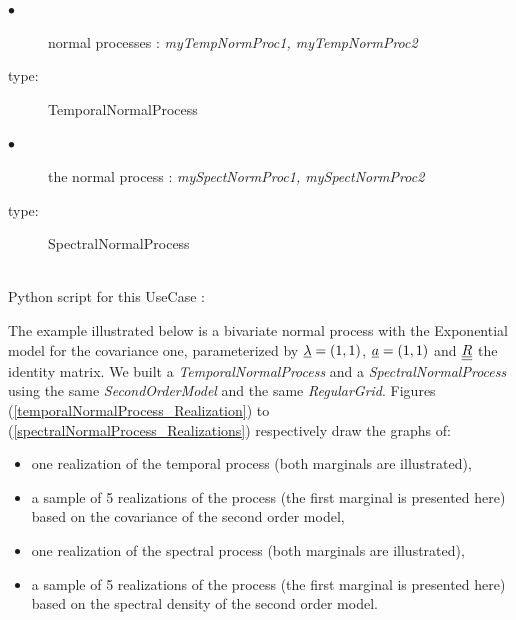 {

  \begin{description}
  \item[$\bullet$] normal processes : {\itshape myTempNormProc1, myTempNormProc2}
  \item[type:]  TemporalNormalProcess
  \end{description}

  \begin{description}
  \item[$\bullet$] the normal process : {\itshape mySpectNormProc1, mySpectNormProc2}
  \item[type:]  SpectralNormalProcess
  \end{description}
}

\textspace\\
Python script for this UseCase :\\




The example illustrated below is a bivariate normal process with the Exponential model for the covariance one, parameterized by  ${\underline{\lambda}}=(1,1)$, ${\underline{a}}=(1,1)$ and ${\underline{\underline{R}}}$ the identity matrix. We built a \textit{TemporalNormalProcess} and a \textit{SpectralNormalProcess} using the same \textit{SecondOrderModel} and the same \textit{RegularGrid}. Figures (\ref{temporalNormalProcess_Realization}) to (\ref{spectralNormalProcess_Realizations}) respectively draw the graphs of:
\begin{itemize}
\item  one realization of the temporal process (both marginals are illustrated),
\item   a sample of 5 realizations of the process (the first marginal is presented here) based on the covariance of the second order model,
\item  one realization of the spectral process (both marginals are illustrated),
\item  a sample of 5 realizations of the process (the first marginal is presented here) based on the spectral density of the second order model.
\end{itemize}

